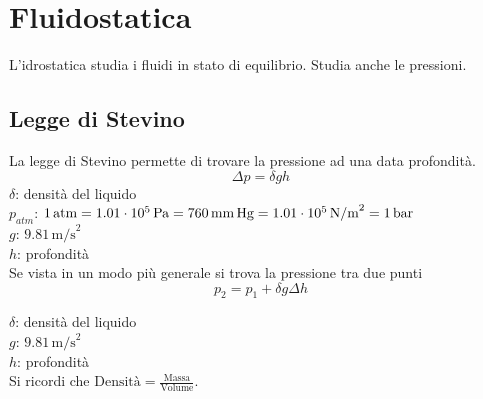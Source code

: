 
\section{Fluidostatica}
L'idrostatica studia i fluidi in stato di equilibrio. Studia anche le pressioni.
\subsection{Legge di Stevino}
La legge di Stevino permette di trovare la pressione ad una data profondità.
\begin{equation*}
  \Delta p = \delta gh
\end{equation*}
$\delta$: densità del liquido\\
\hyperref[tab:patm]{$p_{atm}$}: $1\,\text{atm} = 1.01\cdot10^5\,\text{Pa} = 760\,\text{mm\,Hg} = 
1.01\cdot10^5\,\text{N/m}^2 = 1\,\text{bar}$\\
\hyperref[tab:g]{$g$}: $9.81\,\text{m/s}^2$\\
$h$: profondità\\[\baselineskip]
Se vista in un modo più generale si trova la pressione tra due punti
\begin{equation*}
  p_2 = p_1 + \delta g\Delta h
\end{equation*}
\begin{center}
\end{center}

$\delta$: densità del liquido\\
\hyperref[tab:g]{$g$}: $9.81\,\text{m/s}^2$\\
$h$: profondità\\ [\baselineskip]

Si ricordi che $\text{Densità}=\frac{\text{Massa}}{\text{Volume}}$.

